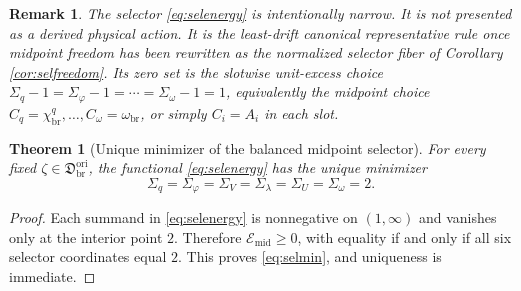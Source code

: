 \documentclass[11pt]{article}
\newcommand{\OriginSector}{\mathfrak D_{\mathrm{br}}^{\mathrm{ori}}}
\newcommand{\AbsReadAmp}{\chi_{\mathrm{br}}^{q}}
\newcommand{\AbsScaleAmp}{\omega_{\mathrm{br}}}
\newcommand{\MidRead}{C_{q}}
\newcommand{\MidScale}{C_{\omega}}
\newcommand{\SelRead}{\Sigma_{q}}
\newcommand{\SelCov}{\Sigma_{\varphi}}
\newcommand{\SelRelax}{\Sigma_{V}}
\newcommand{\SelWell}{\Sigma_{\lambda}}
\newcommand{\SelEq}{\Sigma_{U}}
\newcommand{\SelScale}{\Sigma_{\omega}}
\newcommand{\SelEnergy}{\mathscr E_{\mathrm{mid}}}
\newtheorem{remark}{Remark}
\newtheorem{theorem}{Theorem}
\begin{document}
\begin{remark}
The selector \eqref{eq:selenergy} is intentionally narrow. It is not presented as a derived physical action. It is the least-drift canonical representative rule once midpoint freedom has been rewritten as the normalized selector fiber of Corollary \ref{cor:selfreedom}. Its zero set is the slotwise unit-excess choice \(\SelRead-1=\SelCov-1=\cdots=\SelScale-1=1\), equivalently the midpoint choice \(\MidRead=\AbsReadAmp,\ldots,\MidScale=\AbsScaleAmp\), or simply \(C_i=A_i\) in each slot.
\end{remark}

\begin{theorem}[Unique minimizer of the balanced midpoint selector]
\label{thm:selmin}
For every fixed \(\zeta\in\OriginSector\), the functional \eqref{eq:selenergy} has the unique minimizer
\begin{equation}
\SelRead=\SelCov=\SelRelax=\SelWell=\SelEq=\SelScale=2.
\label{eq:selmin}
\end{equation}
\end{theorem}

\begin{proof}
Each summand in \eqref{eq:selenergy} is nonnegative on \((1,\infty)\) and vanishes only at the interior point \(2\). Therefore \(\SelEnergy\geq0\), with equality if and only if all six selector coordinates equal \(2\). This proves \eqref{eq:selmin}, and uniqueness is immediate.
\end{proof}
\end{document}
